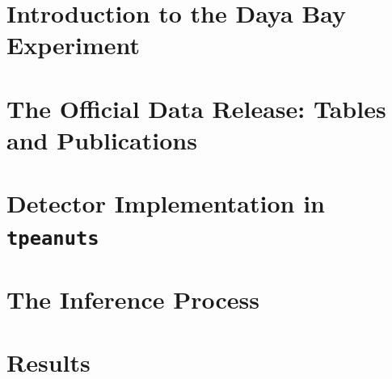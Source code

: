 \documentclass[11pt,a4paper,openany]{report}
\begin{document}
\chapter{Introduction to the Daya Bay Experiment}


\chapter{The Official Data Release: Tables and Publications}


\chapter{Detector Implementation in \texttt{tpeanuts}}

 
\chapter{The Inference Process}


\chapter{Results}


\clearpage
\printbibliography[title={References}]
\end{document}
